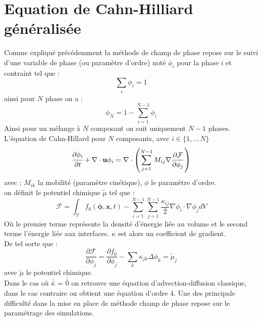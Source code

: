 \documentclass[a4paper,11pt,fleqn]{report}    %
\newcommand{\doubleoverline}[1]{\bar{\bar{#1}}} 			%
\begin{document}
\section{Equation de Cahn-Hilliard généralisée}
Comme expliqué précédemment la méthode de champ de phase repose sur le suivi d'une variable de phase (ou paramètre d'ordre) noté $\phi_i$ pour la phase $i$ et contraint tel que : 
\begin{equation}
\sum_i \phi_i =1
\end{equation} 
ainsi pour $N$ phase on a :
\begin{equation}
\phi_N =1 - \sum_{i=1}^{N-1} \phi_i
\end{equation} 
Ainsi pour un mélange à $N$ composant on suit uniquement $N-1$ phases.
L'équation de Cahn-Hillard pour $N$ composants, avec $i\in \{1,..,N \}$
\begin{equation}
\cfrac{\partial \phi_i}{\partial t} + \nabla \cdot \mathbf{u}\phi_i=  \nabla \cdot \left(\sum_{j=1}^{N-1} M_{ij} \nabla \frac{\partial \mathcal{F}}{\partial \phi_j} \right)
\end{equation}
avec : $M_{ik}$ la mobilité (paramètre cinétique),  $\phi$ le paramètre d'ordre. \\
on définit le potentiel chimique $\tilde\mu$ tel que : \begin{equation}
\mathcal{F} = \int_{\mathcal{V}}f_0(\bm{\phi},\mathbf{x},t)- \sum_{i=1}^{N-1}\sum_{j=1}^{N-1}\frac{\kappa_{ij}}{2}\nabla \phi_i \cdot \nabla \phi_j dV
\end{equation}
Où le premier terme représente la densité d'énergie liée au volume et le second terme l'énergie liée aux interfaces. $\kappa$ est alors un coefficient de gradient. \\
De tel sorte que : 
\begin{equation}\label{eq_potentiel}
	\frac{\partial \mathcal{F}}{\partial \phi_j} = \frac{\partial f_0}{\partial \phi_j} -\sum_k \kappa_{jk} \Delta \phi_k = \tilde{\mu}_j
\end{equation}
avec $\tilde{\mu}$ le potentiel chimique. \\
Dans le cas où $\doubleoverline{\kappa}$ = $\doubleoverline{0}$ on retrouve une équation d'advection-diffusion classique, dans le cas contraire on obtient une équation d'ordre 4. Une des principale difficulté dans la mise en place de méthode champ de phase repose sur le paramétrage des simulations.
\end{document}
